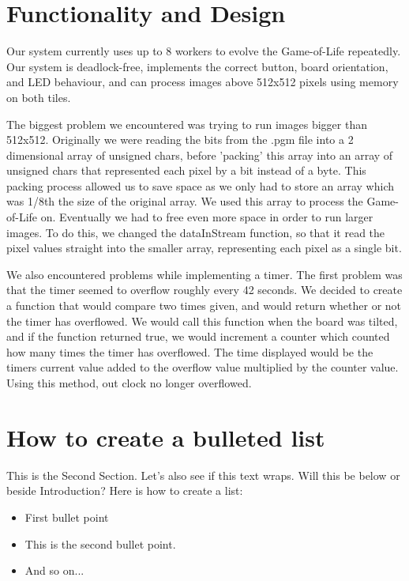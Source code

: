 \documentclass{article}
\begin{document}
\begin{multicols}{2}

\section{Functionality and Design}
Our system currently uses up to 8 workers to evolve the Game-of-Life repeatedly. Our system is deadlock-free, implements the correct button, board orientation, and LED behaviour, and can process images above 512x512 pixels using memory on both tiles.

The biggest problem we encountered was trying to run images bigger than 512x512. Originally we were reading the bits from the .pgm file into a 2 dimensional array of unsigned chars, before 'packing' this array into an array of unsigned chars that represented each pixel by a bit instead of a byte. This packing process allowed us to save space as we only had to store an array which was 1/8th the size of the original array. We used this array to process the Game-of-Life on. Eventually we had to free even more space in order to run larger images. To do this, we changed the dataInStream function, so that it read the pixel values straight into the smaller array, representing each pixel as a single bit. 

We also encountered problems while implementing a timer. The first problem was that the timer seemed to overflow roughly every 42 seconds. We decided to create a function that would compare two times given, and would return whether or not the timer has overflowed. We would call this function when the board was tilted, and if the function returned true, we would increment a counter which counted how many times the timer has overflowed. The time displayed would be the timers current value added to the overflow value multiplied by the counter value. Using this method, out clock no longer overflowed.

\section{How to create a bulleted list}
This is the Second Section. Let's also see if this text wraps. Will this be below or beside Introduction? Here is how to create a list:

\begin{itemize}
\item First bullet point
\item This is the second bullet point.
\item And so on...
\end{itemize}


\end{multicols}
\end{document}
